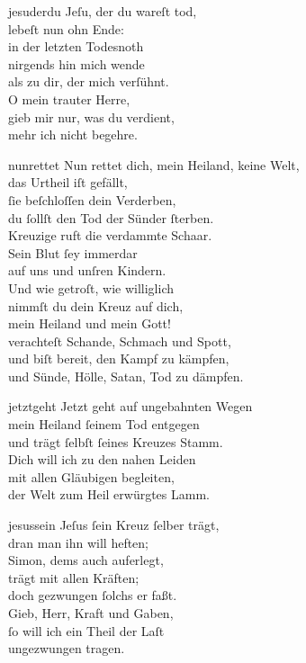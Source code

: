 \documentclass[tocstyle=ref-genre]{ees}
\begin{document}
{  \begin{movement}{jesuderdu}
    \voice[Coro]
    Jeſu, der du wareſt tod,\\
    lebeſt nun ohn Ende:\\
    in der letzten Todesnoth\\
    nirgends hin mich wende\\
    als zu dir, der mich verſühnt.\\
    O mein trauter Herre,\\
    gieb mir nur, was du verdient,\\
    mehr ich nicht begehre.
  \end{movement}

  \begin{movement}{nunrettet}
    \voice[Alto]
    Nun rettet dich, mein Heiland, keine Welt,\\
    das Urtheil iſt gefällt,\\
    ſie beſchloſſen dein Verderben,\\
    du ſollſt den Tod der Sünder ſterben.\\
    Kreuzige ruft die verdammte Schaar.\\
    Sein Blut ſey immerdar\\
    auf uns und unſren Kindern.\\
    Und wie getroſt, wie williglich\\
    nimmſt du dein Kreuz auf dich,\\
    mein Heiland und mein Gott!\\
    verachteſt Schande, Schmach und Spott,\\
    und biſt bereit, den Kampf zu kämpfen,\\
    und Sünde, Hölle, Satan, Tod zu dämpfen.
  \end{movement}

  \begin{movement}{jetztgeht}
    \voice[Alto]
    Jetzt geht auf ungebahnten Wegen\\
    mein Heiland ſeinem Tod entgegen\\
    und trägt ſelbſt ſeines Kreuzes Stamm.\\[1ex]
    Dich will ich zu den nahen Leiden\\
    mit allen Gläubigen begleiten,\\
    der Welt zum Heil erwürgtes Lamm.
  \end{movement}

  \begin{movement}{jesussein}
    \voice[Coro]
    Jeſus ſein Kreuz ſelber trägt,\\
    dran man ihn will heften;\\
    Simon, dems auch auferlegt,\\
    trägt mit allen Kräften;\\
    doch gezwungen ſolchs er faßt.\\
    Gieb, Herr, Kraft und Gaben,\\
    ſo will ich ein Theil der Laſt\\
    ungezwungen tragen.
  \end{movement}

}
\end{document}
